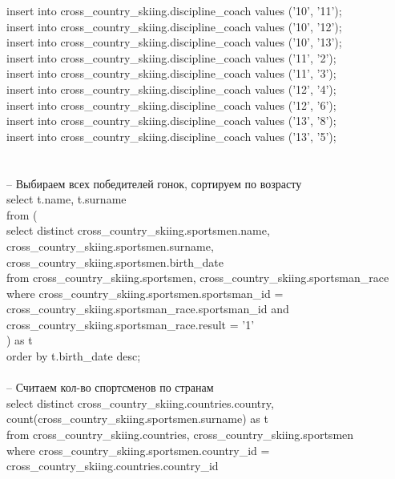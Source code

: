 \documentclass[a4paper,12pt]{article}
\begin{document}
insert into cross\_country\_skiing.discipline\_coach values ('10',  '11');\\
insert into cross\_country\_skiing.discipline\_coach values ('10',  '12');\\
insert into cross\_country\_skiing.discipline\_coach values ('10',  '13');\\
insert into cross\_country\_skiing.discipline\_coach values ('11',  '2');\\
insert into cross\_country\_skiing.discipline\_coach values ('11',  '3');\\
insert into cross\_country\_skiing.discipline\_coach values ('12',  '4');\\
insert into cross\_country\_skiing.discipline\_coach values ('12',  '6');\\
insert into cross\_country\_skiing.discipline\_coach values ('13',  '8');\\
insert into cross\_country\_skiing.discipline\_coach values ('13',  '5');\\
\\
\\
-- Выбираем всех победителей гонок, сортируем по возрасту\\
select t.name, t.surname\\
\indent from (\\
\indent select distinct cross\_country\_skiing.sportsmen.name, cross\_country\_skiing.sportsmen.surname,\\ \indent \indent cross\_country\_skiing.sportsmen.birth\_date\\
\indent from cross\_country\_skiing.sportsmen, cross\_country\_skiing.sportsman\_race\\
\indent where cross\_country\_skiing.sportsmen.sportsman\_id = cross\_country\_skiing.sportsman\_race.sportsman\_id and cross\_country\_skiing.sportsman\_race.result = '1'\\
\indent ) as t\\
\indent order by t.birth\_date desc;\\
\\
-- Считаем кол-во спортсменов по странам\\
select distinct cross\_country\_skiing.countries.country, \\ \indent count(cross\_country\_skiing.sportsmen.surname) as t\\
\indent from cross\_country\_skiing.countries, cross\_country\_skiing.sportsmen\\
\indent where cross\_country\_skiing.sportsmen.country\_id = cross\_country\_skiing.countries.country\_id\\
\end{document}
